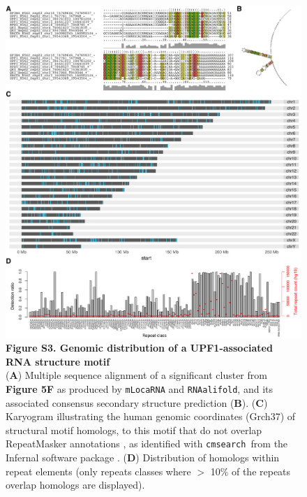 \documentclass{bmcart}
\begin{document}
\begin{figure}
 \includegraphics[width=\textwidth]{SF3}
 \caption*{ \textbf{ Figure S3. Genomic distribution of a UPF1-associated RNA structure motif }\\
(\textbf{A}) Multiple sequence alignment of a significant cluster from \textbf{Figure 5F} as produced by \texttt{mLocaRNA} and \texttt{RNAalifold}, and its associated consensus secondary structure prediction  (\textbf{B}). (\textbf{C}) Karyogram illustrating the human genomic coordinates (Grch37) of structural motif homologs, to this motif that do not overlap RepeatMasker annotations \cite{smit2010repeatmodeler}, as identified with \texttt{cmsearch }from the Infernal software package \cite{nawrocki2013infernal}. (\textbf{D}) Distribution of homologs within repeat elements (only repeats classes where $>$ 10\% of the repeats overlap homologs are displayed). 
}
\end{figure}
\end{document}

